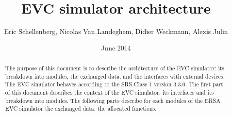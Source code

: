 \documentclass[nocc]{template/openetcs_report}
\begin{document}
\frontmatter
{}




\title{EVC simulator architecture}


\date{June 2014}





\author{Eric Schellenberg, Nicolas Van Landeghem, Didier Weckmann, Alexis Julin}




\begin{abstract}
The purpose of this document is to describe the architecture of the EVC simulator: its breakdown into modules, the exchanged data, and the interfaces with external devices.
The EVC simulator behaves according to the SRS Class 1 version 3.3.0.
The first part of this document describes the context of the EVC simulator, its interfaces and its breakdown into modules.
The following parts describe for each modules of the ERSA EVC simulator the exchanged data, the allocated functions.
\end{abstract}

\maketitle
\end{document}

